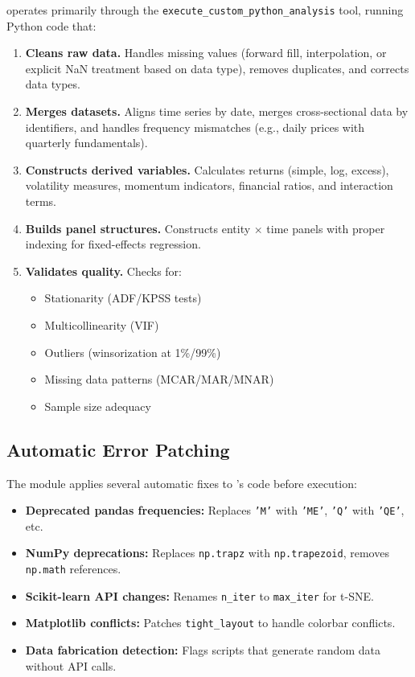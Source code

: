 \newton operates primarily through the \texttt{execute\_custom\_python\_analysis} tool, running Python code that:

\begin{enumerate}
  \item \textbf{Cleans raw data.} Handles missing values (forward fill, interpolation, or explicit NaN treatment based on data type), removes duplicates, and corrects data types.

  \item \textbf{Merges datasets.} Aligns time series by date, merges cross-sectional data by identifiers, and handles frequency mismatches (e.g., daily prices with quarterly fundamentals).

  \item \textbf{Constructs derived variables.} Calculates returns (simple, log, excess), volatility measures, momentum indicators, financial ratios, and interaction terms.

  \item \textbf{Builds panel structures.} Constructs entity $\times$ time panels with proper indexing for fixed-effects regression.

  \item \textbf{Validates quality.} Checks for:
  \begin{itemize}
    \item Stationarity (ADF/KPSS tests)
    \item Multicollinearity (VIF)
    \item Outliers (winsorization at 1\%/99\%)
    \item Missing data patterns (MCAR/MAR/MNAR)
    \item Sample size adequacy
  \end{itemize}
\end{enumerate}

\subsection{Automatic Error Patching}

The  module applies several automatic fixes to \newton's code before execution:

\begin{itemize}
  \item \textbf{Deprecated pandas frequencies:} Replaces \texttt{'M'} with \texttt{'ME'}, \texttt{'Q'} with \texttt{'QE'}, etc.
  \item \textbf{NumPy deprecations:} Replaces \texttt{np.trapz} with \texttt{np.trapezoid}, removes \texttt{np.math} references.
  \item \textbf{Scikit-learn API changes:} Renames \texttt{n\_iter} to \texttt{max\_iter} for t-SNE.
  \item \textbf{Matplotlib conflicts:} Patches \texttt{tight\_layout} to handle colorbar conflicts.
  \item \textbf{Data fabrication detection:} Flags scripts that generate random data without API calls.
\end{itemize}

